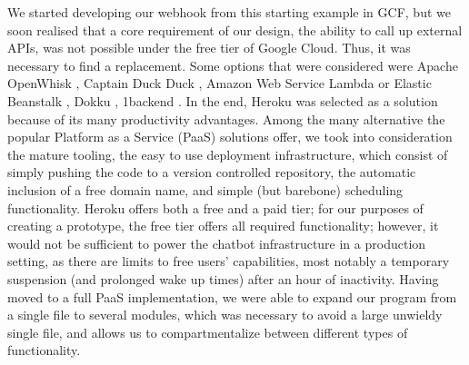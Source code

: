 We started developing our webhook from this starting example in GCF, but we soon realised that a core requirement of our design, the ability to call up external APIs, was not possible under the free tier of Google Cloud. Thus, it was necessary to find a replacement. Some options that were considered were Apache OpenWhisk \cite{apacheopenwhisk}, Captain Duck Duck \cite{captainduckduck}, Amazon Web Service Lambda or Elastic Beanstalk \cite{awsproductwebsite}, Dokku \cite{dokku}, 1backend \cite{1backend}. In the end, Heroku was selected as a solution because of its many productivity advantages. Among the many alternative the popular Platform as a Service (PaaS) solutions offer, we took into consideration the mature tooling, the easy to use deployment infrastructure, which consist of simply pushing the code to a version controlled repository, the automatic inclusion of a free domain name, and simple (but barebone) scheduling functionality. Heroku offers both a free and a paid tier; for our purposes of creating a prototype, the free tier offers all required functionality; however, it would not be sufficient to power the chatbot infrastructure in a production setting, as there are limits to free users' capabilities, most notably a temporary suspension (and prolonged wake up times) after an hour of inactivity.
Having moved to a full PaaS implementation, we were able to expand our program from a single file to several modules, which was necessary to avoid a large unwieldy single file, and allows us to compartmentalize between different types of functionality.
